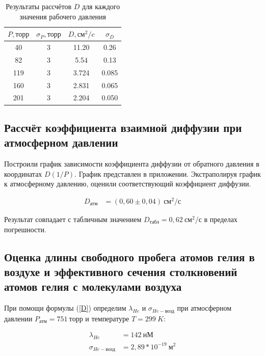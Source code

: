 \documentclass[a4paper, 12pt]{article}
\begin{document}
        \begin{table}[!ht]
            \centering
            \begin{tabular}{|c|c|c|c|}
            \hline
                $P, торр$ & $\sigma_P, торр$ & $D, см^2/c$ & $\sigma_D$ \\ \hline
                40 & 3 & 11.20 & 0.26 \\ \hline
                82 & 3 & 5.54 & 0.13 \\ \hline
                119 & 3 & 3.724 & 0.085 \\ \hline
                160 & 3 & 2.831 & 0.065 \\ \hline
                201 & 3 & 2.204 & 0.050 \\ \hline
            \end{tabular}

            \caption{Результаты рассчётов $D$ для каждого значения рабочего давления}
            \label{coeffs}
        \end{table}

    \subsection{Рассчёт коэффициента взаимной диффузии при атмосферном давлении}

        Построили график зависимости коэффициента диффузии от обратного давления в координатах $D(1/P)$. График представлен в приложении. Экстраполируя график к атмосферному давлению, оценили соответствующий коэффициент диффузии.

        \begin{align}
            D_{атм} &= (0,60 \pm 0,04)~см^2/с
        \end{align}

        Результат совпадает с табличным значением $D_{табл} = 0,62~см^2/с$ в пределах погрешности.

    \subsection{Оценка длины свободного пробега атомов гелия в воздухе и эффективного сечения столкновений атомов гелия с молекулами воздуха}

        При помощи формулы (\ref{D}) определим $\lambda_{He}$ и $\sigma_{He-возд}$ при атмосферном давлении $P_{атм} = 751~торр$ и температуре $T = 299~K$:

        \begin{align}
            \lambda_{He} &= 142~нМ\\
            \sigma_{He-возд} &= 2,89 * 10^{-19}~м^2
        \end{align}
\end{document}
